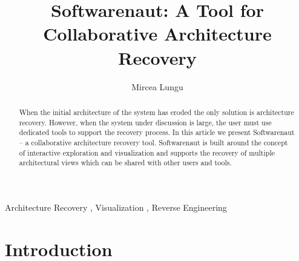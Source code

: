 \documentclass[preprint,12pt]{elsarticle}
\begin{document}
\begin{frontmatter}



\title{Softwarenaut: A Tool for Collaborative Architecture Recovery}


\author{Mircea Lungu}

\address{Software Composition Group\\University of Bern\\Switzerland}

\begin{abstract}
When the initial architecture of the system has eroded the 
only solution is architecture recovery. However, when the 
system under discussion is large, the user must use dedicated
tools to support the recovery process. In this article we present 
Softwarenaut -- a collaborative architecture recovery tool.
Softwarenaut is built around the concept of interactive exploration
and visualization and supports the recovery of multiple architectural
views which can be shared with other users and tools. 
\end{abstract}

\begin{keyword}
Architecture Recovery \sep
Visualization \sep
Reverse Engineering
\end{keyword}

\end{frontmatter}


\section{Introduction}
\label{sec:Introduction}
\end{document}
